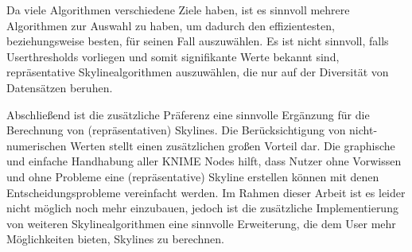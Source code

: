 Da viele Algorithmen verschiedene Ziele haben, ist es sinnvoll mehrere Algorithmen zur Auswahl zu haben, um dadurch den effizientesten, beziehungsweise besten, für seinen Fall auszuwählen. Es ist nicht sinnvoll, falls Userthresholds vorliegen und somit signifikante Werte bekannt sind, repräsentative Skylinealgorithmen auszuwählen, die nur auf der Diversität von Datensätzen beruhen. 

Abschließend ist die zusätzliche Präferenz eine sinnvolle Ergänzung für die Berechnung von (repräsentativen) Skylines. Die Berücksichtigung von nicht-numerischen Werten stellt einen zusätzlichen großen Vorteil dar. Die graphische und einfache Handhabung aller KNIME Nodes hilft, dass Nutzer ohne Vorwissen und ohne Probleme eine (repräsentative) Skyline erstellen können mit denen Entscheidungsprobleme vereinfacht werden. Im Rahmen dieser Arbeit ist es leider nicht möglich noch mehr einzubauen, jedoch ist die zusätzliche Implementierung von weiteren Skylinealgorithmen eine sinnvolle Erweiterung, die dem User mehr Möglichkeiten bieten, Skylines zu berechnen.
